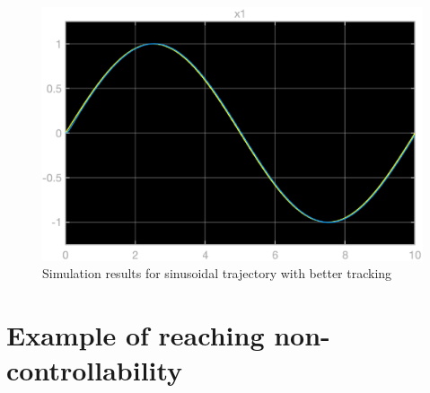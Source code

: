 \begin{figure}[h!]
	\centering
	\includegraphics[width=0.65\linewidth]{Bilder/StSp_FD_Ex1_2.eps}
	\caption{Simulation results for sinusoidal trajectory with better tracking}
	\label{Fig_StSp_FD_Ex1_2}
\end{figure}

\section{Example of reaching non-controllability}

